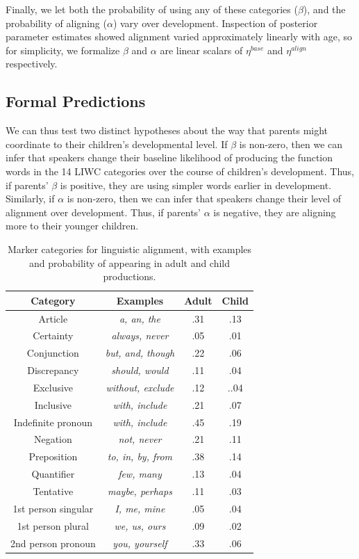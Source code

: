 \documentclass[10pt,letterpaper]{article}
\begin{document}
Finally, we let both the probability of using any of these categories ($\beta$), and the probability of aligning ($\alpha$) vary over development. Inspection of posterior parameter estimates showed alignment varied approximately linearly with age, so for simplicity, we formalize $\beta$ and $\alpha$ are linear scalars of $\eta^{base}$ and $\eta^{align}$ respectively. 

\subsection{Formal Predictions}

We can thus test two distinct hypotheses about the way that parents might coordinate to their children's developmental level. If $\beta$ is non-zero, then we can infer that speakers change their baseline likelihood of producing the function words in the 14 LIWC categories over the course of children's development. Thus, if parents' $\beta$ is positive, they are using simpler words earlier in development. Similarly, if $\alpha$ is non-zero, then we can infer that speakers change their level of alignment over development. Thus, if parents' $\alpha$ is negative, they are aligning more to their younger children.

\begin{table}[tb]
\centering
\begin{tabular}{|c|c|c|c|} \hline
Category & Examples & Adult & Child\\ \hline
Article & \textit{a, an, the} & .31 & .13 \\
Certainty  & \textit{always, never} & .05 & .01 \\
Conjunction  & \textit{but, and, though} & .22 & .06\\
Discrepancy  & \textit{should, would} & .11 & .04 \\
Exclusive  & \textit{without, exclude} & .12 & ..04\\
Inclusive  & \textit{with, include} & .21 & .07\\
Indefinite pronoun & \textit{with, include} & .45 & .19\\
Negation   & \textit{not, never} & .21 & .11\\
Preposition& \textit{to, in, by, from}  & .38 & .14\\
Quantifier   & \textit{few, many} & .13 & .04\\
Tentative & \textit{maybe, perhaps} & .11 & .03\\
1st person singular  & \textit{I, me, mine} & .05 & .04\\
1st person plural & \textit{we, us, ours} & .09 & .02\\
2nd person pronoun   & \textit{you, yourself} & .33 & .06\\
\hline
\end{tabular}
\caption{Marker categories for linguistic alignment, with examples and probability of appearing in adult and child productions.}\label{tab:LIWC}
\end{table}
\end{document}
